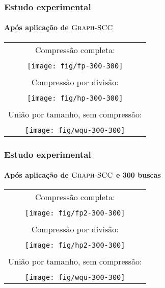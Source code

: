 \documentclass{beamer}
\begin{document}
\begin{frame}
\frametitle{Estudo experimental}
\framesubtitle{Após aplicação de $\textnormal{\scshape Graph-SCC}$}
\begin{center}
\begin{tabular}[t]{c}
Compressão completa: \\
\\
\texttt{[image: fig/fp-300-300]} \\
\\
Compressão por divisão: \\
\\
\texttt{[image: fig/hp-300-300]} \\
\\
União por tamanho, sem compressão: \\
\\
\texttt{[image: fig/wqu-300-300]}
\end{tabular}
\end{center}

\end{frame}

\begin{frame}
\frametitle{Estudo experimental}
\framesubtitle{Após aplicação de $\textnormal{\scshape Graph-SCC}$ e 300 buscas}

\begin{center}
\begin{tabular}[t]{c}
Compressão completa: \\
\\
\texttt{[image: fig/fp2-300-300]} \\
\\
Compressão por divisão: \\
\\
\texttt{[image: fig/hp2-300-300]} \\
\\
União por tamanho, sem compressão: \\
\\
\texttt{[image: fig/wqu-300-300]}
\end{tabular}
\end{center}

\end{frame}
\end{document}
